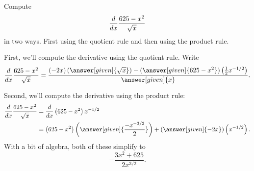 \documentclass{ximera}
\begin{document}
\begin{example}
Compute 
\[
\frac{d}{dx} \frac{625-x^2}{\sqrt{x}}
\] 
in two ways. First using the quotient rule and then using the product
rule.
\begin{explanation}
First, we'll compute the derivative using the quotient rule. Write
\[
\ddx \frac{625-x^2}{\sqrt{x}} = \frac{\left(-2x\right)\left(\answer[given]{\sqrt{x}}\right) - (\answer[given]{625-x^2})\left(\frac{1}{2}x^{-1/2}\right)}{\answer[given]{x}}.
\]
\end{explanation}
\begin{explanation}
Second, we'll compute the derivative using the product rule:
\begin{align*}
\ddx \frac{625-x^2}{\sqrt{x}} &= \ddx \left(625-x^2\right)x^{-1/2}\\
&=\left(625-x^2\right)\left(\answer[given]{\frac{-x^{-3/2}}{2}}\right)+ (\answer[given]{-2x})\left(x^{-1/2}\right).
\end{align*}
With a bit of algebra, both of these simplify to
\[
-\frac{3x^2+625}{2x^{3/2}}.
\]
\end{explanation}
\end{example}
\end{document}

